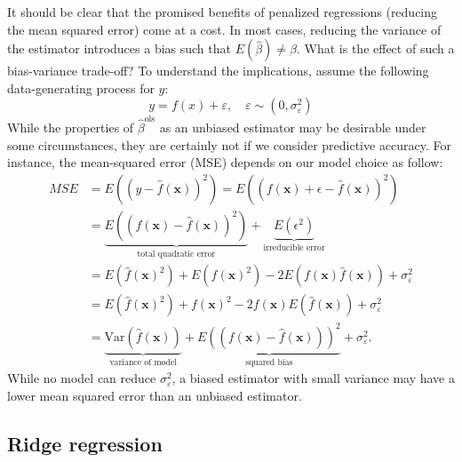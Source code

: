 \documentclass[
]{krantz}
\begin{document}
It should be clear that the promised benefits of penalized regressions (reducing the mean squared error) come at a cost. In most cases, reducing the variance of the estimator introduces a bias such that \(E\left(\hat\beta\right) \neq \beta\). What is the effect of such a bias-variance trade-off? To understand the implications, assume the following data-generating process for \(y\): \[y = f(x) + \varepsilon, \quad \varepsilon \sim (0, \sigma_\varepsilon^2)\] While the properties of \(\hat\beta^\text{ols}\) as an unbiased estimator may be desirable under some circumstances, they are certainly not if we consider predictive accuracy. For instance, the mean-squared error (MSE) depends on our model choice as follow: \[\begin{aligned}
MSE &=E((y-\hat{f}(\textbf{x}))^2)=E((f(\textbf{x})+\epsilon-\hat{f}(\textbf{x}))^2)\\
&= \underbrace{E((f(\textbf{x})-\hat{f}(\textbf{x}))^2)}_{\text{total quadratic error}}+\underbrace{E(\epsilon^2)}_{\text{irreducible error}} \\
&= E\left(\hat{f}(\textbf{x})^2\right)+E\left(f(\textbf{x})^2\right)-2E\left(f(\textbf{x})\hat{f}(\textbf{x})\right)+\sigma_\varepsilon^2\\
&=E\left(\hat{f}(\textbf{x})^2\right)+f(\textbf{x})^2-2f(\textbf{x})E\left(\hat{f}(\textbf{x})\right)+\sigma_\varepsilon^2\\
&=\underbrace{\text{Var}\left(\hat{f}(\textbf{x})\right)}_{\text{variance of model}}+ \underbrace{E\left((f(\textbf{x})-\hat{f}(\textbf{x}))\right)^2}_{\text{squared bias}} +\sigma_\varepsilon^2. 
\end{aligned}\] While no model can reduce \(\sigma_\varepsilon^2\), a biased estimator with small variance may have a lower mean squared error than an unbiased estimator.

\hypertarget{ridge-regression}{%
\subsection{Ridge regression}\label{ridge-regression}}
\end{document}
